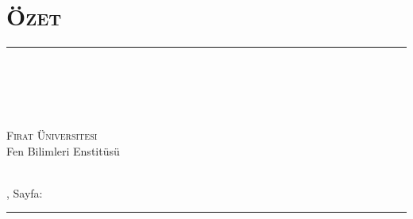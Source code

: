 \chapter*{\Large \bfseries\scshape \"{O}zet}
\vspace{-0.6cm}
\hfill\rule{\textwidth}{0.3pt}\par\vspace{-0.6cm}
\begin{singlespacing}
\begin{center}

\begin{large}
\tezbasligi\\\vspace{0.35cm}
\end{large}


\begin{small}
\textbf{\tezyazari}\\\vspace{0.25cm}
\derece\\\vspace{0.25cm}
\end{small}

\begin{footnotesize}
{\small\textsc{Fırat Üniversitesi\\}Fen Bilimleri Enstitüsü}\\\vspace{0.25cm}

\abd\\

\ay\: \yil , Sayfa: \sayfasayisi\vspace{-0.35cm}
\end{footnotesize}

\hfill\rule{\textwidth}{0.3pt}\par

\end{center}
\end{singlespacing}

